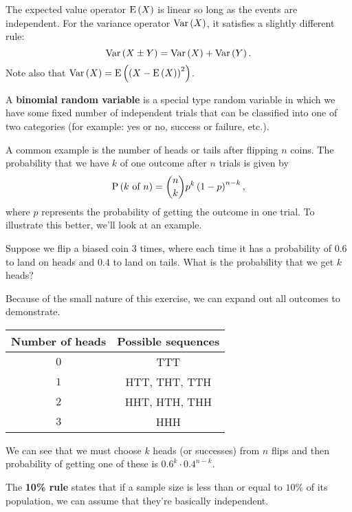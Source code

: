 The expected value operator \( \operatorname{E} \left( X \right) \) is linear so long as the events
are independent. For the variance operator \( \operatorname{Var} \left( X \right) \), it satisfies a
slightly different rule:
\[
    \operatorname{Var} \left( X \pm Y \right) = \operatorname{Var} \left( X \right) + \operatorname{Var} \left( Y \right)
.\]
Note also that \( \operatorname{Var} \left( X \right) = \operatorname{E} \left( \left( X - \operatorname{E} \left( X \right) \right)^2 \right) \).

\begin{blackbox}
    \begin{definition}
        A \textbf{binomial random variable} is a special type random variable
        in which we have some fixed number of independent trials that can be
        classified into one of two categories (for example: yes or no, success
        or failure, etc.).
    \end{definition}
\end{blackbox}

A common example is the number of heads or tails after flipping \( n \) coins.
The probability that we have \( k \) of one outcome after \( n \) trials is
given by
\[
    \operatorname{P} \left( k \text{ of } n \right) = \binom{n}{k} p^k \left( 1 - p \right)^{n - k}
,\]
where \( p \) represents the probability of getting the outcome in one trial.
To illustrate this better, we'll look at an example.

\begin{example}
    Suppose we flip a biased coin \( 3 \) times, where each time it has a
    probability of \( 0.6 \) to land on heads and \( 0.4 \) to land on tails.
    What is the probability that we get \( k \) heads?

    Because of the small nature of this exercise, we can expand out all outcomes to demonstrate.
    \begin{center}
        \begin{tabular}{c|c}
            Number of heads & Possible sequences \\
            \hline
            \( 0 \) & TTT \\
            \( 1 \) & HTT, THT, TTH \\
            \( 2 \) & HHT, HTH, THH \\
            \( 3 \) & HHH
        \end{tabular}
    \end{center}
    We can see that we must choose \( k \) heads (or successes) from \( n \) flips and then probability of getting one of these is \( 0.6^k \cdot 0.4^{n-k} \).
\end{example}

\begin{blackbox}
    \begin{definition}
        The \textbf{10\% rule} states that if a sample size is less than or
        equal to \( 10\% \) of its population, we can assume that they're
        basically independent.
    \end{definition}
\end{blackbox}


